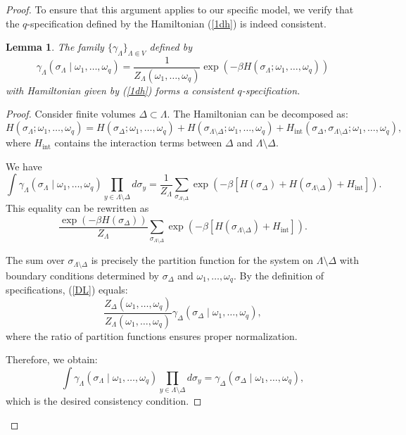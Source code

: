 \documentclass[11pt,reqno]{amsart}
\newtheorem{lemma}{Lemma}
\numberwithin{equation}{section} \setcounter{tocdepth}{1}
\begin{document}
\begin{proof}
To ensure that this argument applies to our specific model, we verify that the $q$-specification defined by the Hamiltonian (\ref{1dh}) is indeed consistent.

\begin{lemma}
The family $\{\gamma_\Lambda\}_{\Lambda \Subset V}$ defined by
$$
\gamma_\Lambda(\sigma_\Lambda \mid \omega_1, \dots, \omega_q) = \frac{1}{Z_\Lambda(\omega_1, \dots, \omega_q)} \exp\left(-\beta H(\sigma_\Lambda; \omega_1, \dots, \omega_q)\right)
$$
with Hamiltonian given by (\ref{1dh}) forms a consistent $q$-specification.
\end{lemma}

\begin{proof}
Consider finite volumes $\Delta \subset \Lambda$. The Hamiltonian can be decomposed as:
$$
H(\sigma_\Lambda; \omega_1, \dots, \omega_q) = H(\sigma_\Delta; \omega_1, \dots, \omega_q) + H(\sigma_{\Lambda \setminus \Delta}; \omega_1, \dots, \omega_q) + H_{\text{int}}(\sigma_\Delta, \sigma_{\Lambda \setminus \Delta}; \omega_1, \dots, \omega_q),
$$
where $H_{\text{int}}$ contains the interaction terms between $\Delta$ and $\Lambda \setminus \Delta$.

We have
$$
\int \gamma_\Lambda(\sigma_\Lambda \mid \omega_1, \dots, \omega_q) \prod_{y \in \Lambda \setminus \Delta} d\sigma_y = \frac{1}{Z_\Lambda} \sum_{\sigma_{\Lambda \setminus \Delta}} \exp\left(-\beta[H(\sigma_\Delta) + H(\sigma_{\Lambda \setminus \Delta}) + H_{\text{int}}]\right).
$$
This equality can be rewritten as
\begin{equation}\label{DL}
\frac{\exp(-\beta H(\sigma_\Delta))}{Z_\Lambda} \sum_{\sigma_{\Lambda \setminus \Delta}} \exp\left(-\beta[H(\sigma_{\Lambda \setminus \Delta}) + H_{\text{int}}]\right).
\end{equation}

The sum over $\sigma_{\Lambda \setminus \Delta}$ is precisely the partition function for the system on $\Lambda \setminus \Delta$ with boundary conditions determined by $\sigma_\Delta$ and $\omega_1, \dots, \omega_q$. By the definition of  specifications, (\ref{DL}) equals:
$$
\frac{Z_\Delta(\omega_1, \dots, \omega_q)}{Z_\Lambda(\omega_1, \dots, \omega_q)} \gamma_\Delta(\sigma_\Delta \mid \omega_1, \dots, \omega_q),
$$
where the ratio of partition functions ensures proper normalization.

Therefore, we obtain:
$$
\int \gamma_\Lambda(\sigma_\Lambda \mid \omega_1, \dots, \omega_q) \prod_{y \in \Lambda \setminus \Delta} d\sigma_y = \gamma_\Delta(\sigma_\Delta \mid \omega_1, \dots, \omega_q),
$$
which is the desired consistency condition.
\end{proof}


\end{proof}
\end{document}
